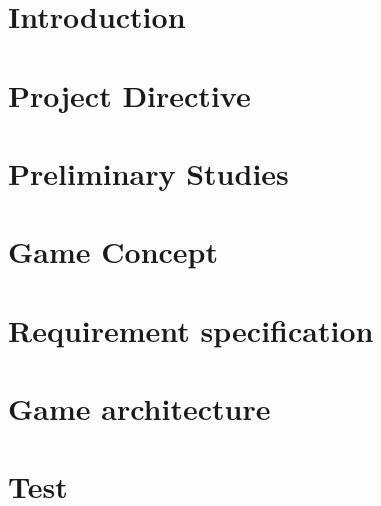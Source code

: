 \documentclass[11pt, a4paper]{article}
\begin{document}


%
\newpage
\tableofcontents
\newpage
{}

\section{Introduction}






\newpage
\section{Project Directive}






\newpage
\section{Preliminary Studies}







\newpage
\section{Game Concept}

\newpage
\section{Requirement specification}




\newpage
\section{Game architecture}
\newpage
\section{Test}
\end{document}
